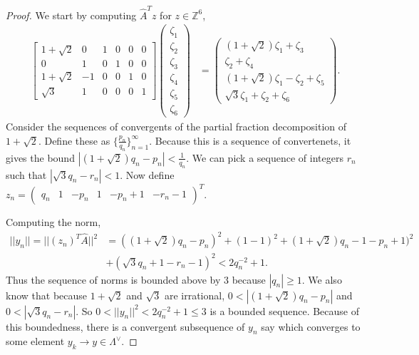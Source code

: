 \documentclass{article}
\renewcommand{\leq}{\leqslant}
\renewcommand{\geq}{\geqslant}
\newcommand{\Z}[0]{\mathbb{Z}}		%
\newcommand{\R}[0]{\mathbb{R}}		%
\theoremstyle{definition}
\theoremstyle{remark}
\begin{document}
\begin{proof}
We start by computing $\hat A^Tz$ for $z\in \Z^6$,
\begin{align}
    \begin{bmatrix}
    1+\sqrt{2} &0 & 1& 0 &0&0 \\ 
    0 &1 & 0& 1 &0&0 \\
    1+\sqrt{2} &-1 & 0& 0 &1&0 \\
    \sqrt{3} &1 & 0& 0 &0&1 
    \end{bmatrix}\begin{pmatrix}
    \zeta_1\\\zeta_2\\\zeta_3\\\zeta_4\\\zeta_5\\\zeta_6
    \end{pmatrix}&= \begin{pmatrix}
    (1+\sqrt{2})\zeta_1 +\zeta_3 \\ 
    \zeta_2 +\zeta_4\\
     (1+\sqrt{2})\zeta_1 -\zeta_2+\zeta_5 \\
          \sqrt{3}\zeta_1 +\zeta_2+\zeta_6
    \end{pmatrix}.
\end{align}
Consider the sequences of convergents of the partial fraction decomposition of $1+\sqrt{2}$. Define these as $\{\frac{p_n}{q_n}\}_{n=1}^\infty$. Because this is a sequence of convertenets, it gives the bound $|(1+\sqrt{2})q_n - p_n|< \frac{1}{q_n}$. 
We can pick a sequence of integers $r_n$ such that $|\sqrt{3}q_n -r_n|<1$. Now  define $z_n = \begin{pmatrix}
q_n & 1& -p_n & 1 & -p_n+1 & -r_n-1 
\end{pmatrix}^T.$ 


 Computing the norm, \begin{align}
     ||y_n|| = ||(z_n)^T\hat A||^2  &= ((1+\sqrt{2})q_n - p_n)^2+ (1-1)^2 +(1+\sqrt{2})q_n - 1- p_n+1)^2  \nonumber\\ &+ (\sqrt{3}q_n +1-r_n-1)^2< 2q_n^{-2}+1.  
 \end{align}Thus the sequence of norms is bounded above by $3$ because $|q_n|\geq 1$. We also know that because $1+\sqrt{2}$ and $\sqrt{3}$ are irrational,  $0<|(1+\sqrt{2})q_n - p_n|$ and $0<|\sqrt{3}q_n -r_n| $. So $0<||y_n||^2 < 2q_n^{-2}+1\leq 3$ is a bounded sequence. Because of this boundedness, there is a convergent subsequence of $y_n$ say which converges to some element $y_k \to y\in \Lambda^\vee$. 


\end{proof}
\end{document}

